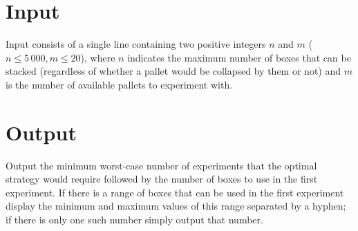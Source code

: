 \section*{Input}

Input consists of a single line containing two positive integers $n$ and $m$ ($n \leq 5\,000, m \leq 20$), where $n$ indicates the maximum number of boxes that can be stacked (regardless of whether a pallet would be collapsed by them or not) and $m$ is the number of available pallets to experiment with.

\section*{Output}

Output the minimum worst-case number of experiments that the optimal strategy would require followed by the number of boxes to use in the first experiment.  If there is a range of boxes that can be used in the first experiment display the minimum and maximum values of this range separated by a hyphen; if there is only one such number simply output that number.

